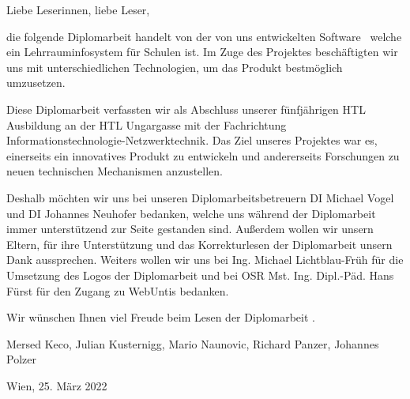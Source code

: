 
Liebe Leserinnen, liebe Leser,

die folgende Diplomarbeit handelt von der von uns entwickelten Software \ZELIA\, welche ein Lehrrauminfosystem für Schulen ist. Im Zuge des Projektes beschäftigten wir uns mit unterschiedlichen Technologien, um das Produkt bestmöglich umzusetzen.

Diese Diplomarbeit verfassten wir als Abschluss unserer fünfjährigen HTL Ausbildung an der HTL Ungargasse mit der Fachrichtung Informations\-technologie-Netzwerk\-technik. Das Ziel unseres Projektes war es, einerseits ein innovatives Produkt zu entwickeln und andererseits Forschungen zu neuen technischen Mechanismen anzustellen.

Deshalb möchten wir uns bei unseren Diplomarbeitsbetreuern DI Michael Vogel und DI Johannes Neuhofer bedanken, welche uns während der Diplomarbeit immer unterstützend zur Seite gestanden sind. Außerdem wollen wir unsern Eltern, für ihre Unterstützung und das Korrekturlesen der Diplomarbeit unsern Dank aussprechen. Weiters wollen wir uns bei Ing. Michael Lichtblau-Früh für die Umsetzung des Logos der Diplomarbeit und bei OSR Mst. Ing. Dipl.-Päd. Hans Fürst für den Zugang zu WebUntis bedanken.

Wir wünschen Ihnen viel Freude beim Lesen der Diplomarbeit \ZELIA.

Mersed Keco, Julian Kusternigg, Mario Naunovic, Richard Panzer, Johannes Polzer

Wien, 25. März 2022
